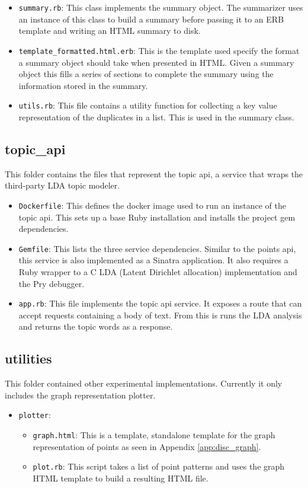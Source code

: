 \begin{itemize}
    \item
      \texttt{summary.rb}: This class implements the summary object. The summarizer uses an instance of this class to build a summary before passing it to an ERB template and writing an HTML summary to disk.
    \item
      \texttt{template\_formatted.html.erb}: This is the template used specify the format a summary object should take when presented in HTML. Given a summary object this fills a series of sections to complete the summary using the information stored in the summary.
    \item
      \texttt{utils.rb}: This file contains a utility function for collecting a key value representation of the duplicates in a list. This is used in the summary class.
  \end{itemize}

\subsection*{topic\_api}
  This folder contains the files that represent the topic api, a service that wraps the third-party LDA topic modeler.
  \begin{itemize}
    \item
      \texttt{Dockerfile}: This defines the docker image used to run an instance of the topic api. This sets up a base Ruby installation and installs the project gem dependencies.
    \item
      \texttt{Gemfile}: This lists the three service dependencies. Similar to the points api, this service is also implemented as a Sinatra application. It also requires a Ruby wrapper to a C LDA (Latent Dirichlet allocation) implementation and the Pry debugger.
    \item
      \texttt{app.rb}: This file implements the topic api service. It exposes a route that can accept requests containing a body of text. From this is runs the LDA analysis and returns the topic words as a response.
  \end{itemize}

\subsection*{utilities}
  This folder contained other experimental implementations. Currently it only includes the graph representation plotter.

  \begin{itemize}
    \item
      \texttt{plotter}:

      \begin{itemize}
      \item
        \texttt{graph.html}: This is a template, standalone template for the graph representation of points as seen in Appendix \ref{app:disc_graph}.
      \item
        \texttt{plot.rb}: This script takes a list of point patterns and uses the graph HTML template to build a resulting HTML file.
      \end{itemize}
  \end{itemize}
